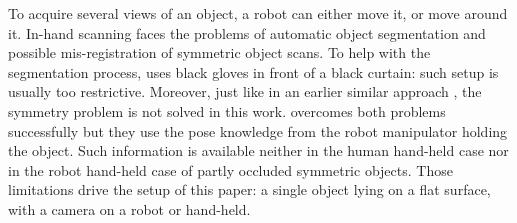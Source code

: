 \documentclass[letterpaper, 10 pt, conference]{ieeeconf}  %
\begin{document}
To acquire several views of an object, a robot can either move it, or move around it. In-hand scanning faces the problems
of automatic object segmentation and possible mis-registration of symmetric object scans. To help with the segmentation 
process,
\cite{weise2011online} uses black gloves in front of a black curtain: such setup is usually too restrictive.
Moreover, just like in an earlier similar approach \cite{rusinkiewicz2002real}, the symmetry problem is not solved in this work.
\cite{krainin2011manipulator} overcomes both problems successfully but
they use the pose knowledge from the robot manipulator holding the object.
Such information is available neither in the human hand-held case 
nor in the robot hand-held case of partly occluded symmetric objects.
Those limitations drive the setup of this paper: a single object lying on a flat surface,
with a camera on a robot or hand-held.
\end{document}
